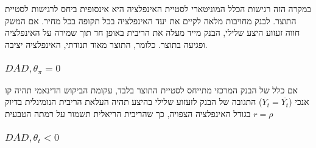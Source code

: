 \documentclass[10pt,usenames,dvipsnames]{beamer}
\begin{document}
\begin{RTL}
\begin{frame}
\begin{center}
    \end{center}
    במקרה הזה רגישות הכלל
המוניטארי לסטיית האינפלציה
היא אינסופית ביחס לרגישות
לסטיית התוצר. לבנק מחויבות
מלאה לקיים את יעד האינפלציה
בכל תקופה בכל מחיר. אם
המשק חווה זעזוע היצע שלילי,
הבנק מייד מעלה את הריבית
באופן חד תוך שמירה על
האינפלציה ופגיעה בתוצר. כלומר,
התוצר מאוד תנודתי, האינפלציה
יציבה.
    

\end{frame}
\begin{frame}
    \frametitle{$DAD, \theta_\pi = 0 $}
    \begin{center}
          
    \end{center}
    אם כלל של הבנק המרכזי מתייחס לסטיית התוצר בלבד, עקומת הביקוש הדינאמי תהיה קו אנכי ($Y_t = \overline{Y_t}$) התגובה של הבנק לזעזוע שלילי בהיצע תהיה העלאת הריבית הנומינלית בדיוק בגודל האינפלציה הצפויה, כך שהריבית הריאלית תשמור על רמתה הטבעית $r = \rho$

    

\end{frame}

\begin{frame}
    \frametitle{$DAD , \theta_t < 0$}
    \begin{center}
\end{center}
\end{frame}
\end{RTL}
\end{document}
